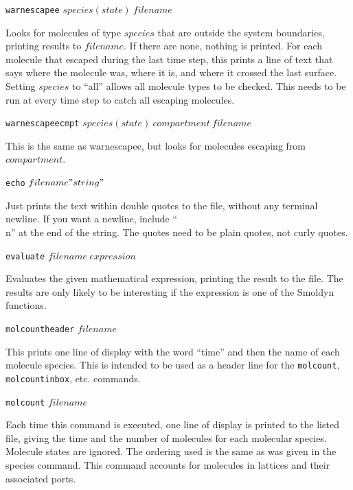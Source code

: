 \documentclass {book}
\newcommand {\ttt} {\texttt}
\begin{document}
\begin{description}

\item{\ttt{warnescapee} $species(state)\ filename$}

Looks for molecules of type $species$ that are outside the system boundaries, printing results to $filename$. If there are none, nothing is printed. For each molecule that escaped during the last time step, this prints a line of text that says where the molecule was, where it is, and where it crossed the last surface. Setting $species$ to ``all'' allows all molecule types to be checked. This needs to be run at every time step to catch all escaping molecules.

\item{\ttt{warnescapeecmpt} $species(state)\ compartment\ filename$}

This is the same as warnescapee, but looks for molecules escaping from $compartment$.

\item{\ttt{echo} $filename "string"$}

Just prints the text within double quotes to the file, without any terminal newline. If you want a newline, include ``\\n'' at the end of the string. The quotes need to be plain quotes, not curly quotes.

\item{\ttt{evaluate} $filename\ expression$}

Evaluates the given mathematical expression, printing the result to the file. The results are only likely to be interesting if the expression is one of the Smoldyn functions.

\item{\ttt{molcountheader} $filename$}

This prints one line of display with the word ``time'' and then the name of each molecule species. This is intended to be used as a header line for the \ttt{molcount}, \ttt{molcountinbox}, etc. commands.

\item{\ttt{molcount} $filename$}

Each time this command is executed, one line of display is printed to the listed file, giving the time and the number of molecules for each molecular species. Molecule states are ignored. The ordering used is the same as was given in the species command. This command accounts for molecules in lattices and their associated ports.


\end{description}
\end{document}
